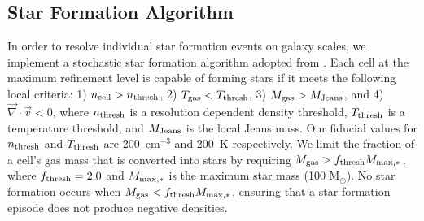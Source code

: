\documentclass[twocolumn]{aastex61}
\begin{document}
\subsection{Star Formation Algorithm}
\label{sec:star formation}
In order to resolve individual star formation events on galaxy scales, we implement a stochastic star formation algorithm adopted from \citet{Goldbaum2015,Goldbaum2016}. Each cell at the maximum refinement level is capable of forming stars if it meets the following local criteria: 1) $n_{\rm cell} > n_{\rm thresh}$, 2) $T_{\rm gas} < T_{\rm thresh}$, 3) $M_{\rm gas} > M_{\rm Jeans}$, and 4) $\vec{\nabla} \cdot \vec{v} < 0$, where $n_{\rm thresh}$ is a resolution dependent density threshold, $T_{\rm thresh}$ is a temperature threshold, and $M_{\rm Jeans}$ is the local Jeans mass. Our fiducial values for $n_{\rm thresh}$ and $T_{\rm thresh}$ are 200~cm$^{-3}$ and 200~K respectively. We limit the fraction of a cell's gas mass that is converted into stars by requiring $M_{\rm gas} > f_{\rm thresh} M_{\rm max,*}$, where $f_{\rm thresh} = 2.0 $ and $M_{\rm max,*}$ is the maximum star mass (100 M$_{\odot}$). No star formation occurs when $M_{\rm gas} < f_{\rm thresh} M_{\rm max,*}$, ensuring that a star formation episode does not produce negative densities.
\end{document}
